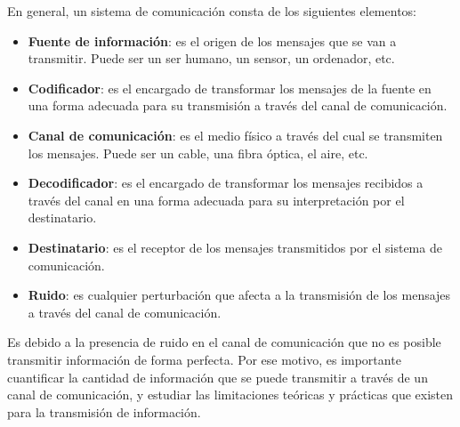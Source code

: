 En general, un sistema de comunicación consta de los siguientes
elementos:

\begin{itemize}
\tightlist
\item
  \textbf{Fuente de información}: es el origen de los mensajes que se
  van a transmitir. Puede ser un ser humano, un sensor, un ordenador,
  etc.
\item
  \textbf{Codificador}: es el encargado de transformar los mensajes de
  la fuente en una forma adecuada para su transmisión a través del canal
  de comunicación.
\item
  \textbf{Canal de comunicación}: es el medio físico a través del cual
  se transmiten los mensajes. Puede ser un cable, una fibra óptica, el
  aire, etc.
\item
  \textbf{Decodificador}: es el encargado de transformar los mensajes
  recibidos a través del canal en una forma adecuada para su
  interpretación por el destinatario.
\item
  \textbf{Destinatario}: es el receptor de los mensajes transmitidos por
  el sistema de comunicación.
\item
  \textbf{Ruido}: es cualquier perturbación que afecta a la transmisión
  de los mensajes a través del canal de comunicación.
\end{itemize}

Es debido a la presencia de ruido en el canal de comunicación que no es
posible transmitir información de forma perfecta. Por ese motivo, es
importante cuantificar la cantidad de información que se puede
transmitir a través de un canal de comunicación, y estudiar las
limitaciones teóricas y prácticas que existen para la transmisión de
información.
